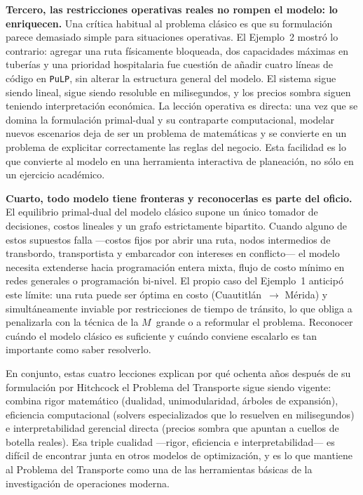 \documentclass[10pt,letterpaper,twocolumn]{article}
\begin{document}
\textbf{Tercero, las restricciones operativas reales no rompen el modelo: lo enriquecen.} Una crítica habitual al problema clásico es que su formulación parece demasiado simple para situaciones operativas. El Ejemplo~2 mostró lo contrario: agregar una ruta físicamente bloqueada, dos capacidades máximas en tuberías y una prioridad hospitalaria fue cuestión de añadir cuatro líneas de código en \texttt{PuLP}, sin alterar la estructura general del modelo. El sistema sigue siendo lineal, sigue siendo resoluble en milisegundos, y los precios sombra siguen teniendo interpretación económica. La lección operativa es directa: una vez que se domina la formulación primal-dual y su contraparte computacional, modelar nuevos escenarios deja de ser un problema de matemáticas y se convierte en un problema de explicitar correctamente las reglas del negocio. Esta facilidad es lo que convierte al modelo en una herramienta interactiva de planeación, no sólo en un ejercicio académico.

\textbf{Cuarto, todo modelo tiene fronteras y reconocerlas es parte del oficio.} El equilibrio primal-dual del modelo clásico supone un único tomador de decisiones, costos lineales y un grafo estrictamente bipartito. Cuando alguno de estos supuestos falla ---costos fijos por abrir una ruta, nodos intermedios de transbordo, transportista y embarcador con intereses en conflicto--- el modelo necesita extenderse hacia programación entera mixta, flujo de costo mínimo en redes generales o programación bi-nivel. El propio caso del Ejemplo~1 anticipó este límite: una ruta puede ser óptima en costo (Cuautitlán~$\to$ Mérida) y simultáneamente inviable por restricciones de tiempo de tránsito, lo que obliga a penalizarla con la técnica de la $M$~grande o a reformular el problema. Reconocer cuándo el modelo clásico es suficiente y cuándo conviene escalarlo es tan importante como saber resolverlo.

En conjunto, estas cuatro lecciones explican por qué ochenta años después de su formulación por Hitchcock el Problema del Transporte sigue siendo vigente: combina rigor matemático (dualidad, unimodularidad, árboles de expansión), eficiencia computacional (solvers especializados que lo resuelven en milisegundos) e interpretabilidad gerencial directa (precios sombra que apuntan a cuellos de botella reales). Esa triple cualidad ---rigor, eficiencia e interpretabilidad--- es difícil de encontrar junta en otros modelos de optimización, y es lo que mantiene al Problema del Transporte como una de las herramientas básicas de la investigación de operaciones moderna.
\end{document}
